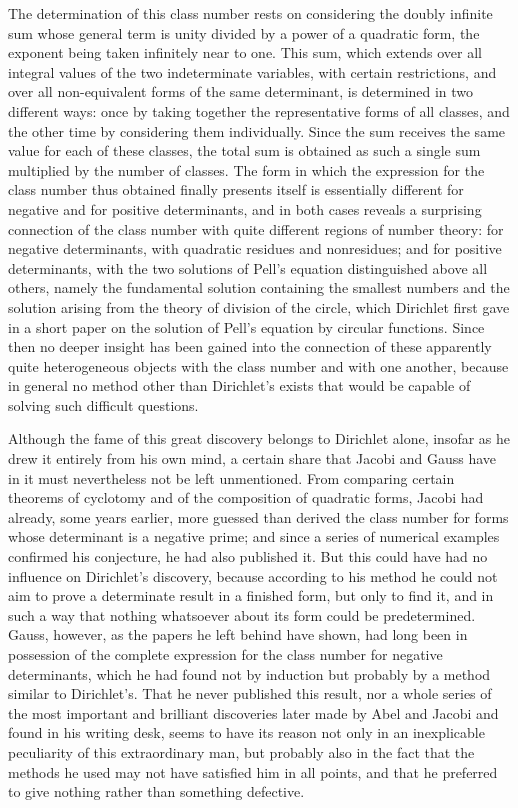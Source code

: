 \documentclass[11pt]{article}
\begin{document}
The determination of this class number rests on considering the doubly infinite sum whose general term is unity divided by a power of a quadratic form, the exponent being taken infinitely near to one. This sum, which extends over all integral values of the two indeterminate variables, with certain restrictions, and over all non-equivalent forms of the same determinant, is determined in two different ways: once by taking together the representative forms of all classes, and the other time by considering them individually. Since the sum receives the same value for each of these classes, the total sum is obtained as such a single sum multiplied by the number of classes. The form in which the expression for the class number thus obtained finally presents itself is essentially different for negative and for positive determinants, and in both cases reveals a surprising connection of the class number with quite different regions of number theory: for negative determinants, with quadratic residues and nonresidues; and for positive determinants, with the two solutions of Pell's equation distinguished above all others, namely the fundamental solution containing the smallest numbers and the solution arising from the theory of division of the circle, which Dirichlet first gave in a short paper on the solution of Pell's equation by circular functions. Since then no deeper insight has been gained into the connection of these apparently quite heterogeneous objects with the class number and with one another, because in general no method other than Dirichlet's exists that would be capable of solving such difficult questions.

Although the fame of this great discovery belongs to Dirichlet alone, insofar as he drew it entirely from his own mind, a certain share that Jacobi and Gauss have in it must nevertheless not be left unmentioned. From comparing certain theorems of cyclotomy and of the composition of quadratic forms, Jacobi had already, some years earlier, more guessed than derived the class number for forms whose determinant is a negative prime; and since a series of numerical examples confirmed his conjecture, he had also published it. But this could have had no influence on Dirichlet's discovery, because according to his method he could not aim to prove a determinate result in a finished form, but only to find it, and in such a way that nothing whatsoever about its form could be predetermined. Gauss, however, as the papers he left behind have shown, had long been in possession of the complete expression for the class number for negative determinants, which he had found not by induction but probably by a method similar to Dirichlet's. That he never published this result, nor a whole series of the most important and brilliant discoveries later made by Abel and Jacobi and found in his writing desk, seems to have its reason not only in an inexplicable peculiarity of this extraordinary man, but probably also in the fact that the methods he used may not have satisfied him in all points, and that he preferred to give nothing rather than something defective.
\end{document}
